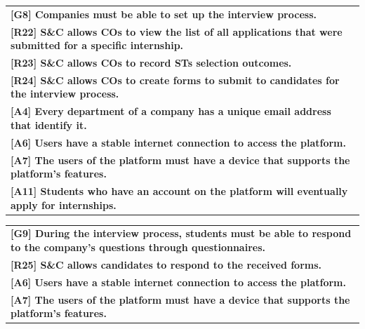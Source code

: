 \begin{center}
    \begin{tabular}{|p{37em}|}
        \rowcolor{bluepoli!40} %
        \hline
        \textbf{[G8] Companies must be able to set up the interview process.} \\
        \rowcolor{bluepoli!15}
        \textbf{[R22] S\&C allows COs to view the list of all applications that were submitted for a specific internship.} \\
        \rowcolor{bluepoli!15}
        \textbf{[R23] S\&C allows COs to record STs selection outcomes.} \\
        \rowcolor{bluepoli!15}
        \textbf{[R24] S\&C allows COs to create forms to submit to candidates for the interview process.} \\
        \textbf{[A4] Every department of a company has a unique email address that identify it.}\\
        \textbf{[A6] Users have a stable internet connection to access the platform.}\\
        \textbf{[A7] The users of the platform must have a device that supports the platform's features.}\\
        \textbf{[A11] Students who have an account on the platform will eventually apply for internships.}\\
        \hline
    \end{tabular}
\end{center}

\begin{center}
    \begin{tabular}{|p{37em}|}
        \rowcolor{bluepoli!40} %
        \hline
        \textbf{[G9] During the interview process, students must be able to respond to the company's questions through questionnaires.} \\
        \rowcolor{bluepoli!15}
        \textbf{[R25] S\&C allows candidates to respond to the received forms.} \\
        \textbf{[A6] Users have a stable internet connection to access the platform.}\\
        \textbf{[A7] The users of the platform must have a device that supports the platform's features.}\\
        \hline
    \end{tabular}
\end{center}

